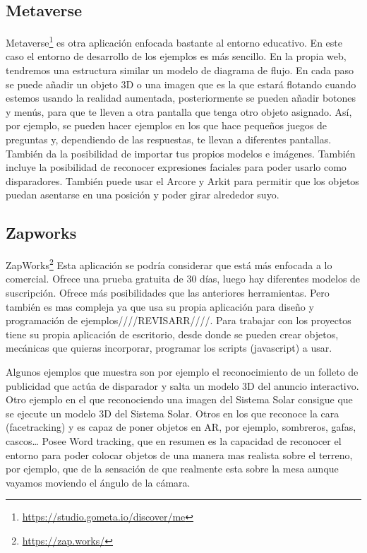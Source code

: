 \subsection{Metaverse} Metaverse\footnote{\url{https://studio.gometa.io/discover/me}} es otra aplicación enfocada bastante al entorno educativo. En este caso el entorno de desarrollo de los ejemplos es más sencillo. En la propia web, tendremos una estructura similar un modelo de diagrama de flujo. En cada paso se puede añadir un objeto 3D o una imagen que es la que estará flotando cuando estemos usando la realidad aumentada, posteriormente se pueden añadir botones y menús, para que te lleven a otra pantalla que tenga otro objeto asignado. Así, por ejemplo, se pueden hacer ejemplos en los que hace pequeños juegos de preguntas y, dependiendo de las respuestas, te llevan a diferentes pantallas.
También da la posibilidad de importar tus propios modelos e imágenes.
También incluye la posibilidad de reconocer expresiones faciales para poder usarlo como disparadores.
También puede usar el Arcore y Arkit para permitir que los objetos puedan asentarse en una posición y poder girar alrededor suyo.

\subsection{Zapworks} ZapWorks\footnote{\url{https://zap.works/}}
Esta aplicación se podría considerar que está más enfocada a lo comercial. Ofrece una prueba gratuita de 30 días, luego hay diferentes modelos de suscripción.
Ofrece más posibilidades que las anteriores herramientas. Pero también es mas compleja ya que usa su propia aplicación para diseño y programación de ejemplos////REVISARR////.
Para trabajar con los proyectos tiene su propia aplicación de escritorio, desde donde se pueden crear objetos, mecánicas que quieras incorporar, programar los scripts (javascript) a usar.

Algunos ejemplos que muestra son por ejemplo el reconocimiento de un folleto de publicidad que actúa de disparador y salta un modelo 3D del anuncio interactivo. Otro ejemplo en el que reconociendo una imagen del Sistema Solar consigue que se ejecute un modelo 3D del Sistema Solar. 
Otros en los que reconoce la cara (facetracking) y es capaz de poner objetos en AR, por ejemplo, sombreros, gafas, cascos…
Posee Word tracking, que en resumen es la capacidad de reconocer el entorno para poder colocar objetos de una manera mas realista sobre el terreno, por ejemplo, que de la sensación de que realmente esta sobre la mesa aunque vayamos moviendo el ángulo de la cámara.

